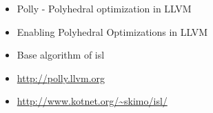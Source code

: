 \begin{itemize}
  \item Polly - Polyhedral optimization in LLVM \cite{grosser.11.impact}  
  \item Enabling Polyhedral Optimizations in LLVM \cite{grosser:thesis}
  \item Base algorithm of isl \cite{Bondhugula:2008:PAP:1379022.1375595}
  \item \url{http://polly.llvm.org} \nocite{Polly:Online}
  \item \url{http://www.kotnet.org/~skimo/isl/} \nocite{ISL:Online}
\end{itemize}





\clearpage
